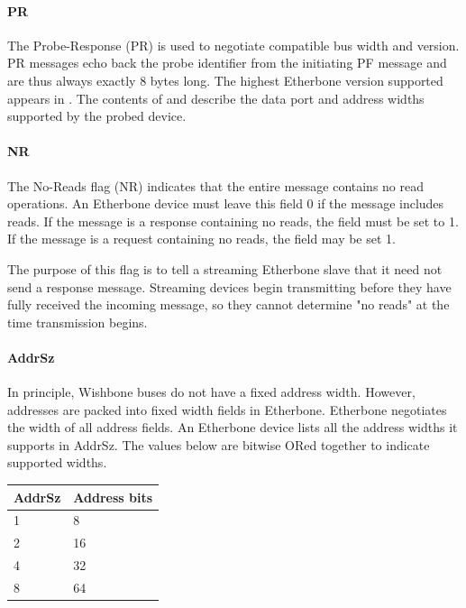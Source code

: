 \documentclass{article}
\begin{document}
\paragraph{PR} \label{field:PR}

The Probe-Response (PR) is used to negotiate compatible bus width and version.
PR messages echo back the probe identifier from the initiating PF message
and are thus always exactly 8 bytes long.
The highest Etherbone version supported appears in .
The contents of  and  
describe the data port and address widths supported by the probed device.

\paragraph{NR} \label{field:NR}

The No-Reads flag (NR) indicates that the entire message 
contains no read operations.
An Etherbone device must leave this field 0 if the message includes reads.
If the message is a response containing no reads,
the field must be set to 1.
If the message is a request containing no reads,
the field may be set 1.

The purpose of this flag is to tell 
a streaming Etherbone slave
that it need not send a response message.
Streaming devices begin transmitting 
before they have fully received the incoming message, 
so they cannot determine "no reads" at the time transmission begins.

\paragraph{AddrSz} \label{field:AddrSz}

In principle, 
Wishbone buses do not have a fixed address width.
However, addresses are packed into fixed width fields in Etherbone.
Etherbone negotiates the width of all address fields.
An Etherbone device lists all the address widths it supports in AddrSz.
The values below are bitwise ORed together to indicate supported widths.

\vspace{1em}
\begin{tabular}{|l|l|}
\hline
AddrSz & Address bits \\
\hline
1 & 8 \\
2 & 16 \\
4 & 32 \\
8 & 64 \\
\hline
\end{tabular}
\end{document}
